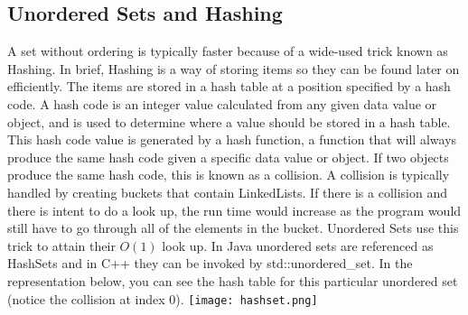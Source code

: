 \subsection{Unordered Sets and Hashing}
A set without ordering is typically faster because of a wide-used trick known as Hashing. In brief, Hashing is a way of storing items so they can be found later on efficiently. The items are stored in a hash table at a position specified by a hash code. A hash code is an integer value calculated from any given data value or object, and is used to determine where a value should be stored in a hash table. This hash code value is generated by a hash function, a function that will always produce the same hash code given a specific data value or object. If two objects produce the same hash code, this is known as a collision. A collision is typically handled by creating buckets that contain LinkedLists. If there is a collision and there is intent to do a look up, the run time would increase as the program would still have to go through all of the elements in the bucket. Unordered Sets use this trick to attain their $O(1)$ look up. In Java unordered sets are referenced as HashSets and in C++ they can be invoked by std::unordered\_set. In the representation below, you can see the hash table for this particular unordered set (notice the collision at index 0).
\texttt{[image: hashset.png]} 


